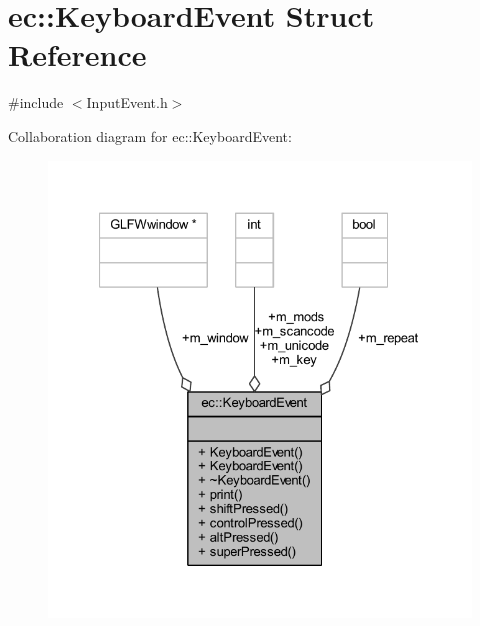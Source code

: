 \hypertarget{structec_1_1_keyboard_event}{}\section{ec\+:\+:Keyboard\+Event Struct Reference}
\label{structec_1_1_keyboard_event}


{\ttfamily \#include $<$Input\+Event.\+h$>$}



Collaboration diagram for ec\+:\+:Keyboard\+Event\+:\nopagebreak
\begin{figure}[H]
\begin{center}
\leavevmode
\includegraphics[width=327pt]{structec_1_1_keyboard_event__coll__graph}
\end{center}
\end{figure}
